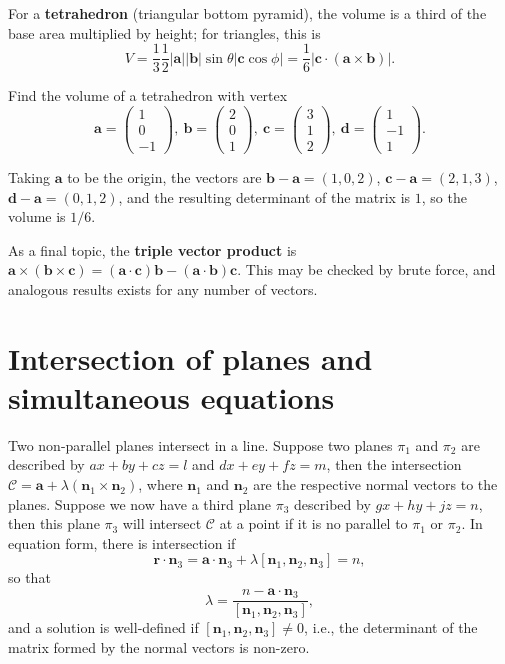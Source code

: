 \documentclass[letter-paper]{tufte-book}
\newenvironment{example}[1][Example]{\begin{trivlist}
\item[\hskip \labelsep {\bfseries #1}]}{\end{trivlist}}
\newcommand{\ab}{\boldsymbol{a}}
\newcommand{\bb}{\boldsymbol{b}}
\newcommand{\cb}{\boldsymbol{c}}
\newcommand{\db}{\boldsymbol{d}}
\newcommand{\nb}{\boldsymbol{n}}
\newcommand\Def[1]{\textbf{#1}}
\begin{document}
For a \Def{tetrahedron} (triangular bottom pyramid), the volume is a third
of the base area multiplied by height; for triangles, this is
\begin{equation*}
	V=\frac{1}{3}\frac{1}{2}|\ab||\bb|\sin\theta|\cb\cos\phi|=
	\frac{1}{6}|\cb\cdot(\ab\times\bb)|.
\end{equation*}
\begin{example}
	Find the volume of a tetrahedron with vertex
	\begin{equation*}
		\ab=\begin{pmatrix}1\\0\\-1\end{pmatrix},\
		\bb=\begin{pmatrix}2\\0\\1\end{pmatrix},\
		\cb=\begin{pmatrix}3\\1\\2\end{pmatrix},\
		\db=\begin{pmatrix}1\\-1\\1\end{pmatrix}.
	\end{equation*}
	
	Taking $\ab$ to be the origin, the vectors are $\bb-\ab=(1,0,2)$,
	$\cb-\ab=(2,1,3)$, $\db-\ab=(0,1,2)$, and the resulting determinant of the
	matrix is $1$, so the volume is $1/6$.
\end{example}

As a final topic, the \Def{triple vector product} is
$\ab\times(\bb\times\cb) = (\ab\cdot\cb)\bb-(\ab\cdot\bb)\cb$. This may be
checked by brute force, and analogous results exists for any number of vectors.


\section{Intersection of planes and simultaneous equations}

Two non-parallel planes intersect in a line. Suppose two planes $\pi_1$ and
$\pi_2$ are described by $ax+by+cz=l$ and $dx+ey+fz=m$, then the intersection
$\mathcal{C}=\ab+\lambda(\nb_1\times\nb_2)$, where $\nb_1$ and $\nb_2$ are the
respective normal vectors to the planes. Suppose we now have a third plane
$\pi_3$ described by $gx+hy+jz=n$, then this plane $\pi_3$ will intersect
$\mathcal{C}$ at a point if it is no parallel to $\pi_1$ or $\pi_2$. In equation
form, there is intersection if
\begin{equation*}
	\boldsymbol{r}\cdot\nb_3=\ab\cdot\nb_3+\lambda[\nb_1,\nb_2,\nb_3]=n,
\end{equation*}
so that
\begin{equation*}
	\lambda=\frac{n-\ab\cdot\nb_3}{[\nb_1,\nb_2,\nb_3]},
\end{equation*}
and a solution is well-defined if $[\nb_1,\nb_2,\nb_3]\neq0$, i.e., the
determinant of the matrix formed by the normal vectors is non-zero.
\end{document}

